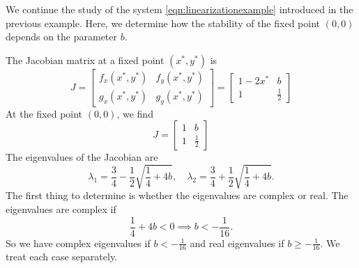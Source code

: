 \begin{xexample}
We continue the study of the system
\eqref{eqn:linearizationexample} introduced in the previous example.
Here, we determine
how the stability of the fixed point $(0,0)$ depends on the parameter $b$.

The Jacobian matrix 
at a fixed point $(x^*,y^*)$ is
\begin{equation}
   J = \begin{bmatrix}
          f_x(x^*,y^*) & f_y(x^*,y^*) \\
	  g_x(x^*,y^*) & g_y(x^*,y^*) 
       \end{bmatrix}
     = \begin{bmatrix}
          1-2x^* & b \\
	   1    & \frac{1}{2}
       \end{bmatrix}
\end{equation}
At the fixed point $(0,0)$, we find
\begin{equation}
  J = \begin{bmatrix}
          1 & b \\
	  1 & \frac{1}{2}
      \end{bmatrix}
\end{equation}
The eigenvalues of the Jacobian are
\begin{equation}
  \lambda_1 = \frac{3}{4} - \frac{1}{2} \sqrt{\frac{1}{4}+4b}, \quad
  \lambda_2 = \frac{3}{4} + \frac{1}{2} \sqrt{\frac{1}{4}+4b}.
\label{eqn:exeigvals}
\end{equation}
The first thing to determine is whether the eigenvalues are
complex or real.  The eigenvalues are complex if
\begin{equation}
  \frac{1}{4} + 4b < 0 \implies b < -\frac{1}{16}.
\end{equation}
So we have complex eigenvalues if $b < -\frac{1}{16}$ and real
eigenvalues if $b \ge -\frac{1}{16}$.
We treat each case separately.


\end{xexample}
